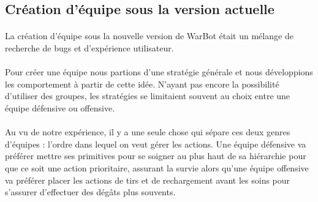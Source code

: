 \documentclass{report}
\begin{document}
\paragraph{}

\subsection{Création d’équipe sous la version actuelle}

\paragraph{}
La création d’équipe sous la nouvelle version de WarBot était un mélange de recherche de bugs et d’expérience utilisateur.
\paragraph{}
Pour créer une équipe nous partions d’une stratégie générale et nous développions les comportement à partir de cette idée. N’ayant pas encore la possibilité d’utiliser des groupes, les stratégies se limitaient souvent au choix entre une équipe défensive ou offensive.
\paragraph{}
Au vu de notre expérience, il y a une seule chose qui sépare ces deux genres d’équipes : l’ordre dans lequel on veut gérer les actions. Une équipe défensive va préférer mettre ses primitives pour se soigner au plus haut de sa hiérarchie pour que ce soit une action prioritaire, assurant la survie alors qu’une équipe offensive va préférer placer les actions de tirs et de rechargement avant les soins pour s’assurer d’effectuer des dégâts plus souvents. 
\end{document}
